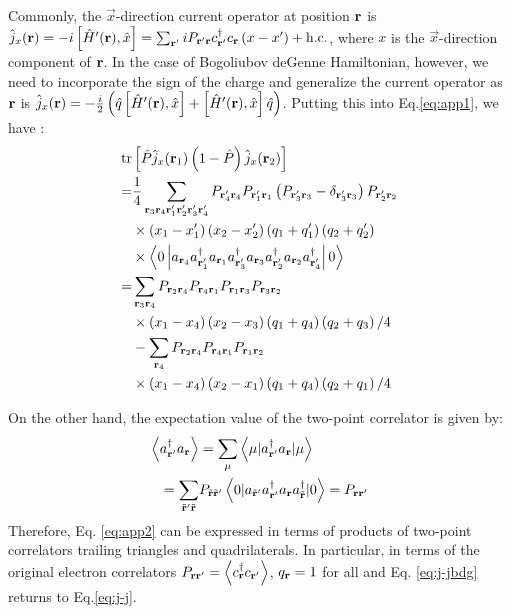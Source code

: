 \documentclass[amsmath,amssymb, aps, prl, twocolumn]{revtex4-1}
\begin{document}
Commonly, the $\vec{x}$-direction current operator at position ${\bf r}$ is $\hat{j}_x({\bf r})=-i\left[\hat{H}'({\bf r}),\hat x\right]=\sum_{{\bf r}'}iP_{{\bf r}'{\bf r}}c_{{\bf r}'}^\dagger c_{{\bf r}}\left(x-x'\right)+\mbox{h.c.}$, where $x$ is the $\vec{x}$-direction component of ${\bf r}$. In the case of Bogoliubov deGenne Hamiltonian, however, we need to incorporate the sign of the charge and generalize the current operator as ${\bf r}$ is $\hat{j}_x({\bf r})=-\frac{i}{2}\left(\hat{q}\left[\hat{H}'({\bf r}),\hat x\right]+\left[\hat{H}'({\bf r}),\hat x\right]\hat{q}\right)$. Putting this into Eq.\ref{eq:app1}, we have :
\begin{equation}
\left.
\begin{aligned}
\mbox{tr}&\left[\hat{P} \hat{j}_x({\bf r}_1) \left(1-\hat{P}\right) \hat{j}_x({\bf r}_2)\right]  \\
=& \frac{1}{4} \sum_{{\bf r}_3 {\bf r}_4 {\bf r}'_1 {\bf r}'_2{\bf r}'_3{\bf r}'_4}P_{{\bf r}'_4 {\bf r}_4}P_{{\bf r}'_1{\bf r}_1}\left(P_{{\bf r}'_3{\bf r}_3}-\delta_{{\bf r}'_3{\bf r}_3}\right)P_{{\bf r}'_2{\bf r}_2} \\&\times\left(x_1-x'_1\right)\left(x_2-x'_2\right)\left(q_1+q'_1\right)\left(q_2+q'_2\right)
\\&\times\left\langle0\left|a_{{\bf r}_4}a^\dagger_{{\bf r}'_1} a_{{\bf r}_1} a^\dagger_{{\bf r}'_3} a_{{\bf r}_3} a^\dagger_{{\bf r}'_2} a_{{\bf r}_2} a^\dagger_{{\bf r}'_4}\right|0\right\rangle \\
=& \sum_{{\bf r}_3 {\bf r}_4}P_{{\bf r}_2 {\bf r}_4}P_{{\bf r}_4{\bf r}_1}P_{{\bf r}_1{\bf r}_3}P_{{\bf r}_3{\bf r}_2}\\
&\times\left(x_1-x_4\right)\left(x_2-x_3\right)\left(q_1+q_4\right)\left(q_2+q_3\right)/4 \\
 &- \sum_{{\bf r}_4}P_{{\bf r}_2 {\bf r}_4}P_{{\bf r}_4{\bf r}_1}P_{{\bf r}_1{\bf r}_2}\\
 &\times\left(x_1-x_4\right)\left(x_2-x_1\right)\left(q_1+q_4\right)\left(q_2+q_1\right)/4
\label{eq:app2}\end{aligned}\right.
\end{equation}

On the other hand, the expectation value of the two-point correlator is given by:
\begin{equation}
\left. \begin{aligned}
\left\langle a_{{\bf r}'}^{\dagger}a_{{\bf r}}\right\rangle  &= \sum_{\mu}\left\langle \mu|a_{{\bf r}'}^{\dagger}a_{{\bf r}}|\mu\right\rangle \\
  =\sum_{\tilde{{\bf r}}' \tilde{{\bf r}}}&P_{\tilde{{\bf r}}\tilde{{\bf r}}'}\left\langle 0|a_{\tilde{{\bf r}}'}a_{{\bf r}'}^{\dagger}a_{{\bf r}}a_{\tilde{{\bf r}}}^{\dagger}|0\right\rangle  =P_{{\bf r}{\bf r}'}
\end{aligned}\right. 
\label{eq:j-jbdg}
\end{equation}
Therefore, Eq. \ref{eq:app2} can be expressed in terms of products of two-point correlators trailing triangles and quadrilaterals. In particular, in terms of the original electron correlators $P_{\bf{r}\bf{r}'}=\left\langle c^\dagger_{\bf{r}}c_{\bf{r}'} \right\rangle$, $q_{\bf{r}}=1$ for all and Eq. \ref{eq:j-jbdg} returns to Eq.\ref{eq:j-j}. 
\end{document}
